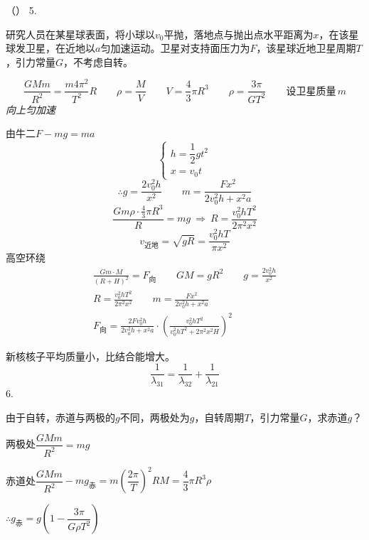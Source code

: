{\small （）} %
5.
\begin{problem}
研究人员在某星球表面，将小球以$v_0$平抛，落地点与抛出点水平距离为$x$，在该星球发卫星，在近地以$a$匀加速运动。卫星对支持面压力为$F$，该星球近地卫星周期$T$，引力常量$G$，不考虑自转。 %
\begin{solution}
\[
\frac{GMm}{R^2}=\frac{m4\pi^2}{T^2}R\qquad \rho=\frac{M}{V}\qquad V=\frac43\pi R^3\qquad \rho=\frac{3\pi}{GT^2}\qquad \text{设卫星质量}\,m
\]
\textit{向上匀加速}

由牛二\quad $F-mg=ma$
\[
\begin{cases}
h=\dfrac12gt^2\\[2mm]
x=v_0t
\end{cases}
\]
\[
\therefore g=\frac{2v_0^2h}{x^2}\qquad m=\frac{Fx^2}{2v_0^2h+x^2a}
\]
\[
\frac{Gm\rho\cdot\frac43\pi R^3}{R}=mg\ \Rightarrow\ R=\frac{v_0^2hT^2}{2\pi^2x^2} %
\]
\[
v_{\text{近地}}=\sqrt{gR}=\frac{v_0^2hT}{\pi x^2}
\]
高空环绕
\begin{gather*}
\frac{Gm\cdot M}{(R+H)^2}=F_{\text{向}}\qquad GM=gR^2\qquad g=\frac{2v_0^2h}{x^2}\\
R=\frac{v_0^2hT^2}{2\pi^2x^2}\qquad m=\frac{Fx^2}{2v_0^2h+x^2a}\\
F_{\text{向}}=\frac{2Fv_0^2h}{2v_0^2h+x^2a}\cdot\left(\frac{v_0^2hT^2}{v_0^2hT^2+2\pi^2x^2H}\right)^2
\end{gather*}
\end{solution}
\end{problem}
新核核子平均质量小，比结合能增大。
\[
\frac{1}{\lambda_{31}}=\frac{1}{\lambda_{32}}+\frac{1}{\lambda_{21}}
\]
6.
\begin{problem}
由于自转，赤道与两极的$g$不同，两极处为$g$，自转周期$T$，引力常量$G$，求赤道$g$？
\begin{solution}
两极处\quad $\dfrac{GMm}{R^2}=mg$

赤道处\quad $\dfrac{GMm}{R^2}-mg_{\text{赤}}=m\left(\dfrac{2\pi}{T}\right)^2R$\quad $M=\dfrac43\pi R^3\rho$

$\therefore g_{\text{赤}}=g\left(1-\dfrac{3\pi}{G\rho T^2}\right)$
\end{solution}
\end{problem}
